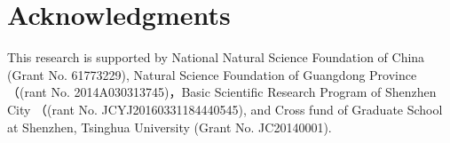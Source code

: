 \documentclass[runningheads,UTF8,article]{comsis2}
\begin{document}
	
	\section{Acknowledgments}
	
	
	This research is supported by National Natural Science Foundation of China (Grant No. 61773229), Natural Science Foundation of Guangdong Province （(rant No. 2014A030313745)，Basic Scientific Research Program of Shenzhen City （(rant No. JCYJ20160331184440545), and Cross fund of Graduate School at Shenzhen, Tsinghua University (Grant No. JC20140001).
	
	
	
	
	


	
	
\end{document}
